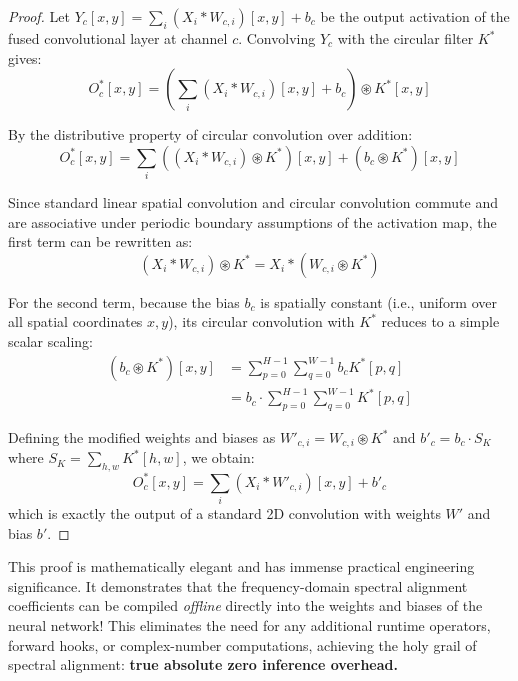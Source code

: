 \documentclass{article}
\theoremstyle{plain}
\theoremstyle{definition}
\theoremstyle{remark}
\begin{document}
\begin{proof}
Let $Y_{c}[x, y] = \sum_i (X_i * W_{c, i})[x, y] + b_c$ be the output activation of the fused convolutional layer at channel $c$. Convolving $Y_c$ with the circular filter $K^*$ gives:
\begin{equation}
    O^*_c[x, y] = \left( \sum_i (X_i * W_{c, i})[x, y] + b_c \right) \circledast K^*[x, y]
\end{equation}

By the distributive property of circular convolution over addition:
\begin{equation}
    O^*_c[x, y] = \sum_i \left( (X_i * W_{c, i}) \circledast K^* \right)[x, y] + (b_c \circledast K^*)[x, y]
\end{equation}

Since standard linear spatial convolution and circular convolution commute and are associative under periodic boundary assumptions of the activation map, the first term can be rewritten as:
\begin{equation}
    (X_i * W_{c, i}) \circledast K^* = X_i * (W_{c, i} \circledast K^*)
\end{equation}

For the second term, because the bias $b_c$ is spatially constant (i.e., uniform over all spatial coordinates $x, y$), its circular convolution with $K^*$ reduces to a simple scalar scaling:
\begin{align}
    (b_c \circledast K^*)[x, y] &= \sum_{p=0}^{H-1} \sum_{q=0}^{W-1} b_c K^*[p, q] \\
    &= b_c \cdot \sum_{p=0}^{H-1} \sum_{q=0}^{W-1} K^*[p, q]
\end{align}

Defining the modified weights and biases as $W'_{c, i} = W_{c, i} \circledast K^*$ and $b'_c = b_c \cdot S_K$ where $S_K = \sum_{h, w} K^*[h, w]$, we obtain:
\begin{equation}
    O^*_c[x, y] = \sum_i (X_i * W'_{c, i})[x, y] + b'_c
\end{equation}
which is exactly the output of a standard 2D convolution with weights $W'$ and bias $b'$.
\end{proof}

This proof is mathematically elegant and has immense practical engineering significance. It demonstrates that the frequency-domain spectral alignment coefficients can be compiled \emph{offline} directly into the weights and biases of the neural network! This eliminates the need for any additional runtime operators, forward hooks, or complex-number computations, achieving the holy grail of spectral alignment: \textbf{true absolute zero inference overhead.}
\end{document}
